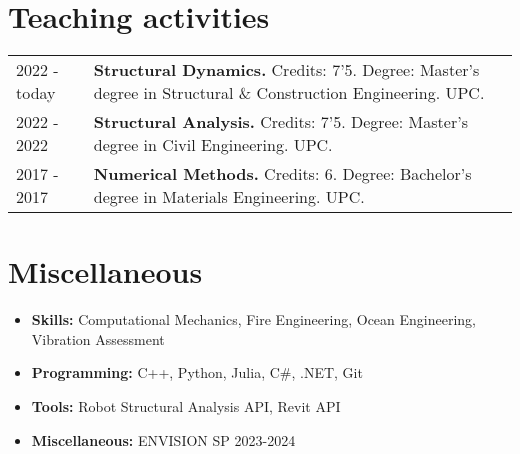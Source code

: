 \documentclass[12pt]{article}
\begin{document}
\section{Teaching activities}
\begin{tabularx}{\linewidth}{lX}
    2022 - today &
    \textbf{Structural Dynamics.} Credits: 7'5. Degree: Master's degree in Structural \& Construction Engineering. UPC. \\

    2022 - 2022 &
    \textbf{Structural Analysis.} Credits: 7'5. Degree: Master's degree in Civil Engineering. UPC. \\

    2017 - 2017 &
    \textbf{Numerical Methods.} Credits: 6. Degree: Bachelor's degree in Materials Engineering. UPC. \\
\end{tabularx}


\printbibliography[heading={bibintoc}, title={Participation in R+D+i projects}, type=project]


\section{Miscellaneous}
\begin{itemize}
    \itemsep=-.3em
    \item \textbf{Skills:} Computational Mechanics, Fire Engineering, Ocean Engineering, Vibration Assessment
    \item \textbf{Programming:} C++, Python, Julia, C\#, .NET, Git
    \item \textbf{Tools:} Robot Structural Analysis API, Revit API
    \item \textbf{Miscellaneous:} ENVISION SP 2023-2024
\end{itemize}
\end{document}

